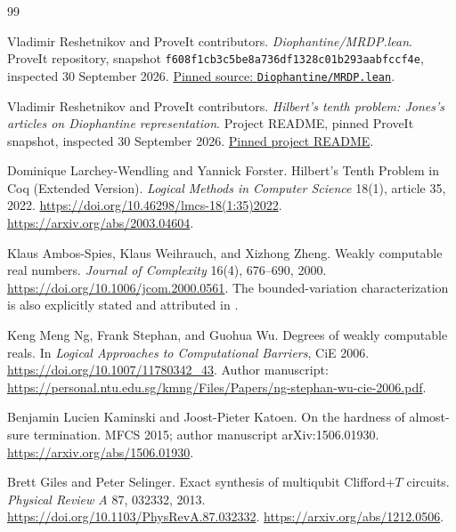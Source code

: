 \documentclass[11pt,letterpaper]{article}
\numberwithin{equation}{section}
\theoremstyle{definition}
\theoremstyle{remark}
\newcommand{\snapshot}{\texttt{f608f1cb3c5be8a736df1328c01b293aabfccf4e}}
\begin{document}
\begin{thebibliography}{99}
\small\raggedright
\setlength{\itemsep}{3pt}
\setlength{\parskip}{0pt}
Vladimir Reshetnikov and ProveIt contributors.
\emph{Diophantine/MRDP.lean}.
ProveIt repository, snapshot \snapshot, inspected 30 September 2026.
\href{https://github.com/VladimirReshetnikov/ProveIt/blob/f608f1cb3c5be8a736df1328c01b293aabfccf4e/Computability/HilbertTenthProblem/Lean/Diophantine/MRDP.lean}{Pinned source: \texttt{Diophantine/MRDP.lean}}.

Vladimir Reshetnikov and ProveIt contributors.
\emph{Hilbert's tenth problem: Jones's articles on Diophantine representation}.
Project README, pinned ProveIt snapshot, inspected 30 September 2026.
\href{https://github.com/VladimirReshetnikov/ProveIt/blob/f608f1cb3c5be8a736df1328c01b293aabfccf4e/Computability/HilbertTenthProblem/README.md}{Pinned project README}.

Dominique Larchey-Wendling and Yannick Forster.
Hilbert's Tenth Problem in Coq (Extended Version).
\emph{Logical Methods in Computer Science} 18(1), article 35, 2022.
\url{https://doi.org/10.46298/lmcs-18(1:35)2022}.
\url{https://arxiv.org/abs/2003.04604}.

Klaus Ambos-Spies, Klaus Weihrauch, and Xizhong Zheng.
Weakly computable real numbers.
\emph{Journal of Complexity} 16(4), 676--690, 2000.
\url{https://doi.org/10.1006/jcom.2000.0561}.
The bounded-variation characterization is also explicitly stated and
attributed in \cite{ng-stephan-wu}.

Keng Meng Ng, Frank Stephan, and Guohua Wu.
Degrees of weakly computable reals.
In \emph{Logical Approaches to Computational Barriers}, CiE 2006.
\url{https://doi.org/10.1007/11780342_43}.
Author manuscript:
\url{https://personal.ntu.edu.sg/kmng/Files/Papers/ng-stephan-wu-cie-2006.pdf}.

Benjamin Lucien Kaminski and Joost-Pieter Katoen.
On the hardness of almost-sure termination.
MFCS 2015; author manuscript arXiv:1506.01930.
\url{https://arxiv.org/abs/1506.01930}.

Brett Giles and Peter Selinger.
Exact synthesis of multiqubit Clifford+$T$ circuits.
\emph{Physical Review A} 87, 032332, 2013.
\url{https://doi.org/10.1103/PhysRevA.87.032332}.
\url{https://arxiv.org/abs/1212.0506}.


\end{thebibliography}
\end{document}
